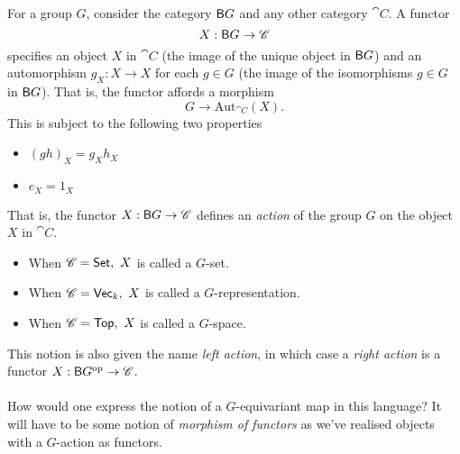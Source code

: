 \vspace*{1em}

\begin{example}\label{gsetasfunc}
For a group $G$, consider the category $\mathsf{B}G$ and any other category $\cat{C}$. A functor
\[X:\mathsf{B}G \to \mathscr{C}\]
specifies an object $X$ in $\cat{C}$ (the image of the unique object in $\mathsf{B}G$) and an automorphism $g_X: X \to X$ for each $g \in G$ (the image of the isomorphisms $g \in G$ in $\mathsf{B}G$). That is, the functor affords a morphism
\[G \to \mathrm{Aut}_{\cat{C}}(X).\]
This is subject to the following two properties
\begin{itemize}
\item $(gh)_X = g_Xh_X$
\item $e_X = 1_X$
\end{itemize} 
That is, the functor $X:\mathsf{B}G \to \mathscr{C}$ defines an \emph{action} of the group $G$ on the object $X$ in $\cat{C}$.
\begin{itemize}[leftmargin=*]
\item When $\mathscr{C} = \mathsf{Set},\ X$ is called a $G$-set.
\item When $\cat{C} = \ncat{Vec}_k,\ X$ is called a $G$-representation.
\item When $\mathscr{C} = \mathsf{Top},\ X$ is called a $G$-space.
\end{itemize}
This notion is also given the name \emph{left action}, in which case a \emph{right action} is a functor $X:\mathsf{B}G^{\text{op}} \to \mathscr{C}$.\\
\\
How would one express the notion of a $G$-equivariant map in this language? It will have to be some notion of \emph{morphism of functors} as we've realised objects with a $G$-action as functors.
\end{example}

\vspace*{0.1in}

